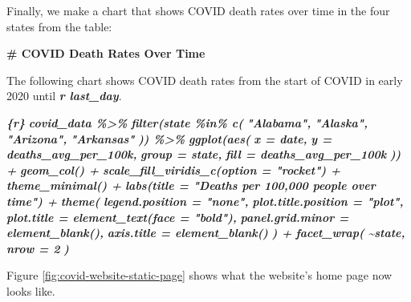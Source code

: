 \documentclass[
]{book}
\newenvironment{Shaded}{\begin{snugshade}}{\end{snugshade}}
\newcommand{\FunctionTok}[1]{\textcolor[rgb]{0.13,0.29,0.53}{\textbf{#1}}}
\newcommand{\InformationTok}[1]{\textcolor[rgb]{0.56,0.35,0.01}{\textbf{\textit{#1}}}}
\newcommand{\NormalTok}[1]{#1}
\begin{document}
Finally, we make a chart that shows COVID death rates over time in the four states from the table:

\begin{Shaded}
\begin{Highlighting}[]
\FunctionTok{\# COVID Death Rates Over Time}

\NormalTok{The following chart shows COVID death rates from the start of COVID in early 2020 until }\InformationTok{\textasciigrave{}r last\_day\textasciigrave{}}\NormalTok{.}

\InformationTok{\textasciigrave{}\textasciigrave{}\textasciigrave{}\{r\}}
\InformationTok{covid\_data \%\textgreater{}\%}
\InformationTok{  filter(state \%in\% c(}
\InformationTok{    "Alabama",}
\InformationTok{    "Alaska",}
\InformationTok{    "Arizona",}
\InformationTok{    "Arkansas"}
\InformationTok{  )) \%\textgreater{}\%}
\InformationTok{  ggplot(aes(}
\InformationTok{    x = date,}
\InformationTok{    y = deaths\_avg\_per\_100k,}
\InformationTok{    group = state,}
\InformationTok{    fill = deaths\_avg\_per\_100k}
\InformationTok{  )) +}
\InformationTok{  geom\_col() +}
\InformationTok{  scale\_fill\_viridis\_c(option = "rocket") +}
\InformationTok{  theme\_minimal() +}
\InformationTok{  labs(title = "Deaths per 100,000 people over time") +}
\InformationTok{  theme(}
\InformationTok{    legend.position = "none",}
\InformationTok{    plot.title.position = "plot",}
\InformationTok{    plot.title = element\_text(face = "bold"),}
\InformationTok{    panel.grid.minor = element\_blank(),}
\InformationTok{    axis.title = element\_blank()}
\InformationTok{  ) +}
\InformationTok{  facet\_wrap(}
\InformationTok{    \textasciitilde{}state,}
\InformationTok{    nrow = 2}
\InformationTok{  )}
\InformationTok{\textasciigrave{}\textasciigrave{}\textasciigrave{}}
\end{Highlighting}
\end{Shaded}

Figure \ref{fig:covid-website-static-page} shows what the website's home page now looks like.
\end{document}
